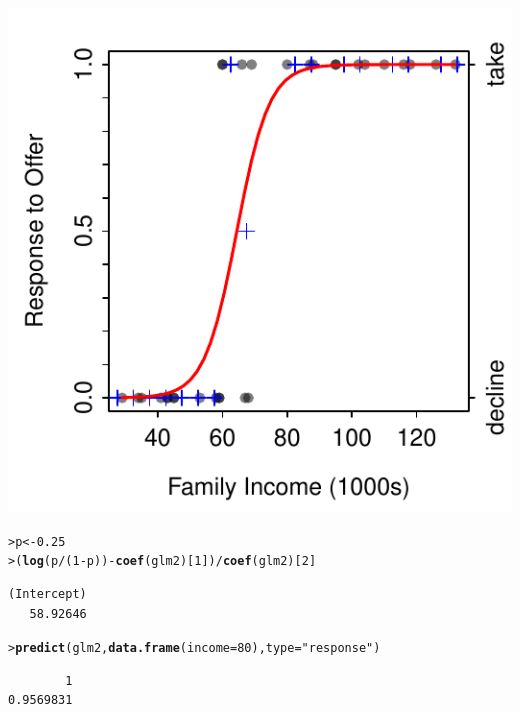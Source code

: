\documentclass{article}\usepackage[]{graphicx}\usepackage[]{color}
\makeatletter
\newcommand{\hlnum}[1]{\textcolor[rgb]{0.686,0.059,0.569}{#1}}%
\newcommand{\hlstr}[1]{\textcolor[rgb]{0.192,0.494,0.8}{#1}}%
\newcommand{\hlopt}[1]{\textcolor[rgb]{0,0,0}{#1}}%
\newcommand{\hlstd}[1]{\textcolor[rgb]{0.345,0.345,0.345}{#1}}%
\newcommand{\hlkwb}[1]{\textcolor[rgb]{0.69,0.353,0.396}{#1}}%
\newcommand{\hlkwc}[1]{\textcolor[rgb]{0.333,0.667,0.333}{#1}}%
\newcommand{\hlkwd}[1]{\textcolor[rgb]{0.737,0.353,0.396}{\textbf{#1}}}%
\newenvironment{kframe}{%
 \def\at@end@of@kframe{}%
 \ifinner\ifhmode%
  \def\at@end@of@kframe{\end{minipage}}%
  \begin{minipage}{\columnwidth}%
 \fi\fi%
 \def\FrameCommand##1{\hskip\@totalleftmargin \hskip-\fboxsep
 \colorbox{shadecolor}{##1}\hskip-\fboxsep
     \hskip-\linewidth \hskip-\@totalleftmargin \hskip\columnwidth}%
 \MakeFramed {\advance\hsize-\width
   \@totalleftmargin\z@ \linewidth\hsize
   \@setminipage}}%
 {\par\unskip\endMakeFramed%
 \at@end@of@kframe}
\newenvironment{knitrout}{}{} %
\makeatother
\begin{document}
\begin{knitrout}
{\centering \includegraphics[width=.4\linewidth]{Figs/SolarLogPlot-2} 

}


\begin{kframe}\begin{alltt}
\hlstd{> }\hlstd{p} \hlkwb{<-} \hlnum{0.25}
\hlstd{> }\hlstd{(}\hlkwd{log}\hlstd{(p}\hlopt{/}\hlstd{(}\hlnum{1}\hlopt{-}\hlstd{p))}\hlopt{-}\hlkwd{coef}\hlstd{(glm2)[}\hlnum{1}\hlstd{])}\hlopt{/}\hlkwd{coef}\hlstd{(glm2)[}\hlnum{2}\hlstd{]}
\end{alltt}
\begin{verbatim}
(Intercept) 
   58.92646 
\end{verbatim}
\begin{alltt}
\hlstd{> }\hlkwd{predict}\hlstd{(glm2,}\hlkwd{data.frame}\hlstd{(}\hlkwc{income}\hlstd{=}\hlnum{80}\hlstd{),}\hlkwc{type}\hlstd{=}\hlstr{"response"}\hlstd{)}
\end{alltt}
\begin{verbatim}
        1 
0.9569831 
\end{verbatim}
\end{kframe}
\end{knitrout}
\end{document}
